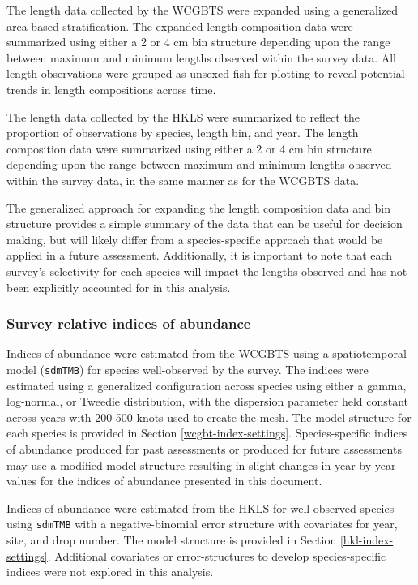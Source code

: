 \documentclass[
  english,
]{article}
\begin{document}
The length data collected by the WCGBTS were expanded using a
generalized area-based stratification. The expanded length composition
data were summarized using either a 2 or 4 cm bin structure depending
upon the range between maximum and minimum lengths observed within the
survey data. All length observations were grouped as unsexed fish for
plotting to reveal potential trends in length compositions across time.

The length data collected by the HKLS were summarized to reflect the
proportion of observations by species, length bin, and year. The length
composition data were summarized using either a 2 or 4 cm bin structure
depending upon the range between maximum and minimum lengths observed
within the survey data, in the same manner as for the WCGBTS data.

The generalized approach for expanding the length composition data and
bin structure provides a simple summary of the data that can be useful
for decision making, but will likely differ from a species-specific
approach that would be applied in a future assessment. Additionally, it
is important to note that each survey's selectivity for each species
will impact the lengths observed and has not been explicitly accounted
for in this analysis.

\subsubsection{Survey relative indices of
abundance}\label{survey-relative-indices-of-abundance}

Indices of abundance were estimated from the WCGBTS using a
spatiotemporal model (\texttt{sdmTMB}) for species well-observed by the
survey. The indices were estimated using a generalized configuration
across species using either a gamma, log-normal, or Tweedie
distribution, with the dispersion parameter held constant across years
with 200-500 knots used to create the mesh. The model structure for each
species is provided in Section \ref{wcgbt-index-settings}.
Species-specific indices of abundance produced for past assessments or
produced for future assessments may use a modified model structure
resulting in slight changes in year-by-year values for the indices of
abundance presented in this document.

Indices of abundance were estimated from the HKLS for well-observed
species using \texttt{sdmTMB} with a negative-binomial error structure
with covariates for year, site, and drop number. The model structure is
provided in Section \ref{hkl-index-settings}. Additional covariates or
error-structures to develop species-specific indices were not explored
in this analysis.
\end{document}
